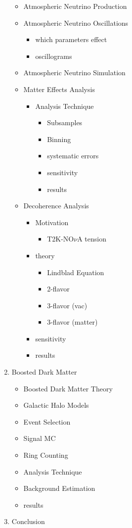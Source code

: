 \documentclass[12pt,oneside,openright]{article}
\begin{document}
\begin{enumerate}
	\begin{itemize}
	\item Atmospheric Neutrino Production
	\item Atmospheric Neutrino Oscillations
		\begin{itemize}
		\item which parameters effect
		\item oscillograms
		\end{itemize}
	\item Atmospheric Neutrino Simulation
	\item Matter Effects Analysis
		\begin{itemize}
		\item Analysis Technique
			\begin{itemize}
			\item Subsamples
			\item Binning
			\item systematic errors
			\item sensitivity
			\item results
			\end{itemize} 
		\end{itemize}
	\item Decoherence Analysis
		\begin{itemize}
		\item Motivation
			\begin{itemize}
			\item T2K-NO$\nu$A tension
			\end{itemize}
		\item theory
			\begin{itemize}
			\item Lindblad Equation
			\item 2-flavor
			\item 3-flavor (vac)
			\item 3-flavor (matter)	
			\end{itemize}
		\item sensitivity
		\item results
		\end{itemize}
	\end{itemize} 
\item Boosted Dark Matter
	\begin{itemize}
	\item Boosted Dark Matter Theory
	\item Galactic Halo Models
	\item Event Selection
	\item Signal MC
	\item Ring Counting
	\item Analysis Technique
	\item Background Estimation
	\item results
	\end{itemize}
\item Conclusion
\end{enumerate}
\end{document}
